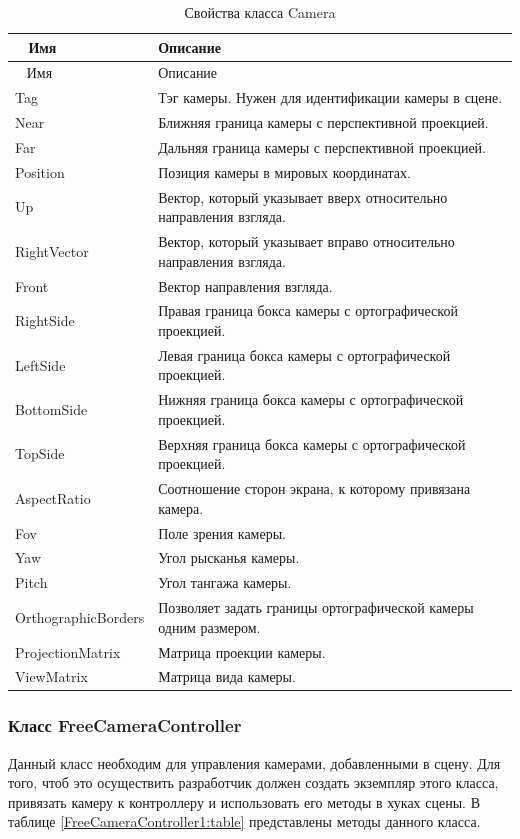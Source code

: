 \begin{xltabular}{\textwidth}{|>{\raggedright\arraybackslash}p{6cm}|>{\raggedright\arraybackslash}X|}
	\caption{Свойства класса Camera\label{camera2:table}}\\ \hline
	~ \centrow Имя & \centrow Описание \\ \hline
	\endfirsthead
	~ \centrow Имя & \centrow Описание \\ \hline 
	\finishhead
	Tag & Тэг камеры. Нужен для идентификации камеры в сцене. \\ \hline
	Near & Ближняя граница камеры с перспективной проекцией. \\ \hline
	Far & Дальняя граница камеры с перспективной проекцией. \\ \hline
	Position & Позиция камеры в мировых координатах. \\ \hline
	Up & Вектор, который указывает вверх относительно направления взгляда. \\ \hline
	RightVector & Вектор, который указывает вправо относительно направления взгляда. \\ \hline
	Front & Вектор направления взгляда. \\ \hline
	RightSide & Правая граница бокса камеры с ортографической проекцией. \\ \hline
	LeftSide & Левая граница бокса камеры с ортографической проекцией. \\ \hline
	BottomSide & Нижняя граница бокса камеры с ортографической проекцией. \\ \hline
	TopSide & Верхняя граница бокса камеры с ортографической проекцией. \\ \hline
	AspectRatio & Соотношение сторон экрана, к которому привязана камера. \\ \hline
	Fov & Поле зрения камеры. \\ \hline
	Yaw & Угол рысканья камеры. \\ \hline
	Pitch & Угол тангажа камеры. \\ \hline
	OrthographicBorders & Позволяет задать границы ортографической камеры одним размером. \\ \hline
	ProjectionMatrix & Матрица проекции камеры. \\ \hline
	ViewMatrix & Матрица вида камеры.
\end{xltabular}

\subsubsection{Класс FreeCameraController}
Данный класс необходим для управления камерами, добавленными в сцену. Для того, чтоб это осуществить разработчик должен создать экземпляр этого класса, привязать камеру к контроллеру и использовать его методы в хуках сцены. В таблице \ref{FreeCameraController1:table} представлены методы данного класса.

